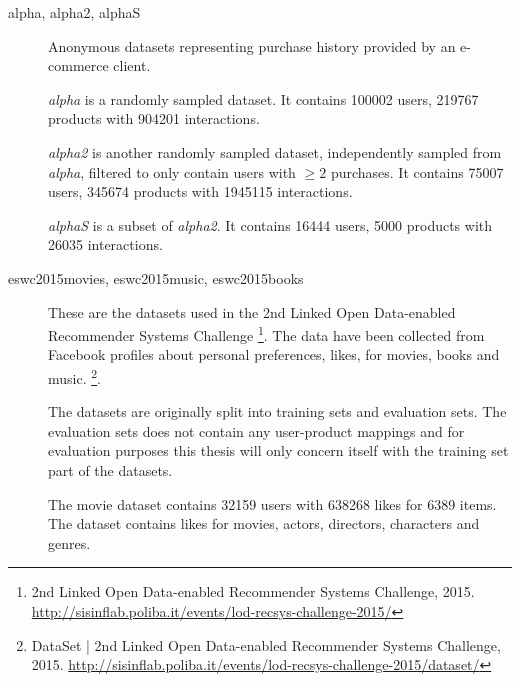 \FloatBarrier

\begin{description}
    \item[alpha, alpha2, alphaS] \hfill

        Anonymous datasets representing purchase history provided by an e-commerce client.

        \textit{alpha} is a randomly sampled dataset. It contains 100002 users, 219767 products with 904201 interactions.

        \textit{alpha2} is another randomly sampled dataset, independently sampled from \textit{alpha}, filtered to only contain users with $\geq 2$ purchases. It contains 75007 users, 345674 products with 1945115 interactions.

        \textit{alphaS} is a subset of \textit{alpha2}. It contains 16444 users, 5000 products with 26035 interactions.




    \item[eswc2015movies, eswc2015music, eswc2015books] \hfill

        These are the datasets used in the 2nd Linked Open Data-enabled Recommender Systems Challenge
        \footnote{2nd Linked Open Data-enabled Recommender Systems Challenge, 2015. \url{http://sisinflab.poliba.it/events/lod-recsys-challenge-2015/}}.
        The data have been collected from Facebook profiles about personal preferences, likes, for movies, books and music.
        \footnote{DataSet | 2nd Linked Open Data-enabled Recommender Systems Challenge, 2015. \url{http://sisinflab.poliba.it/events/lod-recsys-challenge-2015/dataset/}}.

        The datasets are originally split into training sets and evaluation sets. The evaluation sets does not contain any user-product mappings and for evaluation purposes this thesis will only concern itself with the training set part of the datasets.

        The movie dataset contains 32159 users with 638268 likes for 6389 items. The dataset contains likes for movies, actors, directors, characters and genres.


\end{description}
